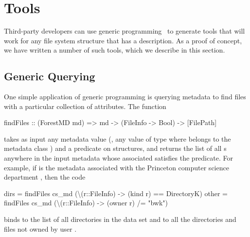 \section{Tools}
\label{sec:tools}



Third-party developers can use generic programming~\cite{Lammel+:syb} to
generate tools that will work for any file system structure that has a
\forest{} description.  As a proof of concept, we have written a
number of such tools, which we describe in this section.  

\subsection{Generic Querying }
One simple application of generic programming is querying 
metadata to find files with a particular collection of attributes. 
The  function 
\begin{code}
findFiles :: (ForestMD md) => 
     md -> (FileInfo -> Bool) -> [FilePath]
\end{code}
takes as input any \forest{} metadata value (\ie{}, any
value of type  where  belongs to the \forest{}
metadata class ) and a predicate on 
structures, and returns the list of all s anywhere in the
input metadata whose associated  satisfies the
predicate.  For example, if  is the metadata associated
with the Princeton computer science department \filestore{}, then the code 
\begin{code}
dirs  = findFiles cs_md (\textbackslash(r::FileInfo) -> 
                           (kind r) == DirectoryK)
other = findFiles cs_md (\textbackslash(r::FileInfo) -> 
                           (owner r) /= "bwk")
\end{code}
binds  to the list of all directories in the data set and
 to all the directories and files not owned by 
user .

